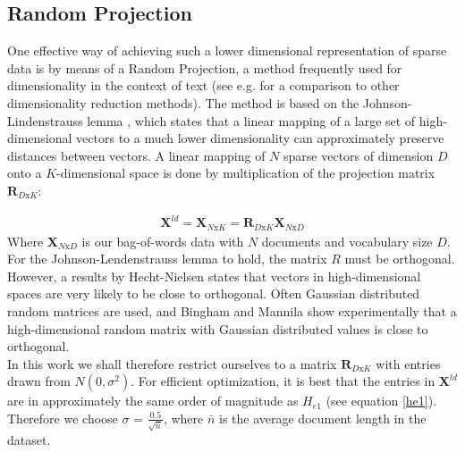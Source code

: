 \documentclass{report}
\begin{document}
\subsection{Random Projection}\label{RP}
One effective way of achieving such a lower dimensional representation of sparse data is by means of a Random Projection, a method frequently used for dimensionality in the context of text (see e.g. \cite{bingham2001random} for a comparison to other dimensionality reduction methods). The method is based on the Johnson-Lindenstrauss lemma \cite{frankl1988johnson}, which states that a linear mapping of a large set of high-dimensional vectors to a much lower dimensionality can approximately preserve distances between vectors. A linear mapping of $N$ sparse vectors of dimension $D$ onto a $K$-dimensional space is done by multiplication of the projection matrix $\mathbf{R}_{D\text{x}K}$:

\begin{align}\label{RPeq}
\mathbf{X}^{ld} = \mathbf{X}_{N\text{x}K} = \mathbf{R}_{D\text{x}K}\mathbf{X}_{N\text{x}D}
\end{align}
Where $\mathbf{X}_{N\text{x}D}$ is our bag-of-words data with $N$ documents and vocabulary size $D$.\\

For the Johnson-Lendenstrauss lemma to hold, the matrix $R$ must be orthogonal. However, a results by Hecht-Nielsen \cite{hecht1994context} states that vectors in high-dimensional spaces are very likely to be close to orthogonal. Often Gaussian distributed random matrices are used, and Bingham  and Mannila \cite{bingham2001random} show experimentally that a high-dimensional random matrix with Gaussian distributed values is close to orthogonal. \\
In this work we shall therefore restrict ourselves to a matrix $\mathbf{R}_{D\text{x}K}$ with entries drawn from $N(0,\sigma^2)$. For efficient optimization, it is best that the entries in $\mathbf{X}^{ld}$ are in approximately the same order of magnitude as $H_{e1}$ (see equation \ref{he1}). Therefore we choose $\sigma$ = $\frac{0.5}{\sqrt{\bar{n}}}$, where $\bar{n}$ is the average document length in the dataset. \\
\end{document}

